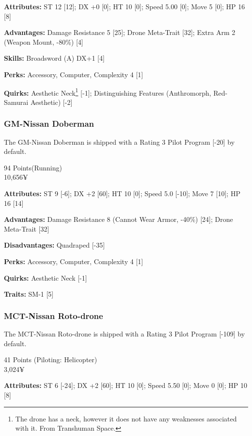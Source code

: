 \begin{multicols*}{2}
	\textbf{Attributes:} 
	ST 12 [12]; DX +0 [0]; HT 10 [0]; 
	Speed 5.00 [0]; Move 5 [0]; HP 16 [8] 	
	
	\textbf{Advantages:} 
	Damage Resistance 5 [25]; Drone Meta-Trait [32]; Extra Arm 2 (Weapon Mount, -80\%) [4]
	
	\textbf{Skills:}
	Broadsword (A) DX+1 [4]
	
	\textbf{Perks:}
	Accessory, Computer, Complexity 4 [1]
	
	\textbf{Quirks:}
	Aesthetic Neck\footnote{The drone has a neck, however it does not have any weaknesses associated with it. From Transhuman Space.} [-1]; Distinguishing Features (Anthromorph, Red-Samurai Aesthetic) [-2]
	
	\subsubsection{GM-Nissan Doberman}
	
	The GM-Nissan Doberman is shipped with a Rating 3 Pilot Program [-20] by default.
	
	\begin{flushright}
		94 Points(Running)\\
		10,656¥
	\end{flushright}
	
	\textbf{Attributes:} 
	ST 9 [-6]; DX +2 [60]; HT 10 [0]; 
	Speed 5.0 [-10]; Move 7 [10]; HP 16 [14]
	
	\textbf{Advantages:} 
	Damage Resistance 8 (Cannot Wear Armor, -40\%) [24]; Drone Meta-Trait [32]
	
	\textbf{Disadvantages:} 
	Quadraped [-35]
	
	\textbf{Perks:}
	Accessory, Computer, Complexity 4 [1]
	
	\textbf{Quirks:}
	Aesthetic Neck [-1]
	
	\textbf{Traits:}
	SM-1 [5]
	
	\subsubsection{MCT-Nissan Roto-drone}
	
	The MCT-Nissan Roto-drone is shipped with a Rating 3 Pilot Program [-109] by default.
	
	\begin{flushright}
		41 Points (Piloting: Helicopter)\\
		3,024¥
	\end{flushright}
	
	\textbf{Attributes:} 
	ST 6 [-24]; DX +2 [60]; HT 10 [0]; 
	Speed 5.50 [0]; Move 0 [0]; HP 10 [8]
	

\end{multicols*}
